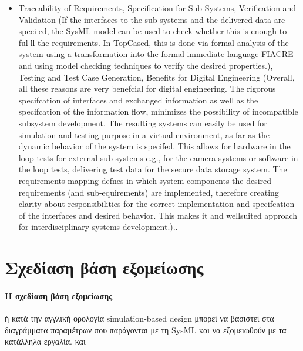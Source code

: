 \documentclass[a4paper,12pt,twoside]{report}
\begin{document}
\begin{itemize}
				\item Traceability of Requirements, Specification for Sub-Systems, Verification and Validation (If the interfaces to the sub-systems and the delivered data are specied, the SysML model can be used to check whether this is enough to fulll the requirements. In TopCased, this is done via formal analysis of the system using a transformation into the formal immediate language FIACRE and using model checking techniques to verify the desired properties.), Testing and Test Case Generation, Benefits for Digital Engineering (Overall, all these reasons are very benefcial for digital engineering. The rigorous specifcation of interfaces and exchanged information as well as the specifcation of the information flow, minimizes the possibility of incompatible subsystem development. The resulting systems can easily be used for simulation and testing purpose in a virtual environment, as far as the dynamic behavior of the system is specifed. This allows for hardware in the loop tests for external sub-systems e.g., for the camera systems or software in the loop tests, delivering test data for the secure data storage system. The requirements mapping defnes in which system components the desired requirements (and sub-equirements) are implemented, therefore creating clarity about responsibilities for the correct implementation and specifcation of the interfaces and desired behavior. This makes it and wellsuited approach for interdisciplinary systems development.).\cite{SysMLDigitalEngineering}.
			\end{itemize}
			



		\section{Σχεδίαση βάση εξομείωσης}
			\paragraph{Η σχεδίαση βάση εξομείωσης} {ή κατά την αγγλική ορολογία simulation-based design μπορεί να βασιστεί στα διαγράμματα παραμέτρων που παράγονται με τη SysML και να εξομειωθούν με τα κατάλληλα εργαλία. \cite{SimBasedDesignP1} και \cite{SimBasedDesignP2}
			}

\end{document}
